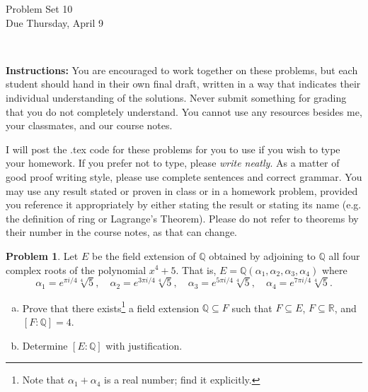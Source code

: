 \documentclass[11pt]{article}
\title{}
\date{\vspace{-0.5in}}
\newcommand{\Q}{\mathbb{Q}}
\newcommand{\R}{\mathbb{R}}
\theoremstyle{definition}
\newtheorem{problem}{Problem}
\begin{document}
\thispagestyle{fancy}
\pagestyle{fancy}

\vspace{3em}

\begin{center}
	{\LARGE Problem Set 10 \\}
	Due Thursday, April 9\end{center}

\

\noindent
{\bf Instructions:}
You are encouraged to work together on these problems, but each student should hand in their own final draft, written in a way that indicates their individual understanding of the solutions. Never submit something for grading that you do not completely understand. You cannot use any resources besides me, your classmates, and our course notes.


I will post the .tex code for these problems for you to use if you wish to type your homework. If you prefer not to type, please  {\em write neatly}. As a matter of good proof writing style, please use complete sentences and correct grammar. You may use any result stated or proven in class or in a homework problem, provided you reference it appropriately by either stating the result or stating its name (e.g. the definition of ring or Lagrange's Theorem). Please do not refer to theorems by their number in the course notes, as that can change.



\begin{problem}
Let $E$ be the field extension of $\Q$ obtained by adjoining to $\Q$ all four complex roots of the polynomial $x^4 + 5$.
That is, $E = \Q(\alpha_1, \alpha_2, \alpha_3, \alpha_4)$ where
$$\alpha_1 = e^{\pi i/4}\sqrt[4]{5}, \quad
\alpha_2 = e^{3\pi i/4}\sqrt[4]{5}, \quad
\alpha_3 = e^{5\pi i/4}\sqrt[4]{5}, \quad
\alpha_4 = e^{7\pi i/4}\sqrt[4]{5}.$$

\begin{enumerate}[(a)]
\item Prove that there exists\footnote{Note that $\alpha_1 + \alpha_4$ is a real number; find it explicitly.} 
 a field extension $\Q \subseteq F$ such that $F \subseteq E$, $F \subseteq \R$, and $[F :\Q]=4$.


\item Determine $[E : \Q]$ with justification.
\end{enumerate}
\end{problem}
\end{document}
